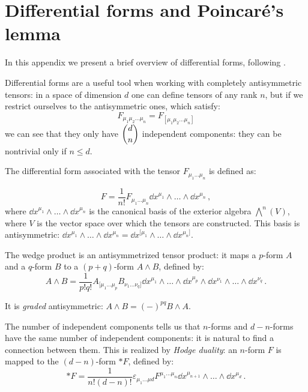 \documentclass[main.tex]{subfiles}
\begin{document}
\clearpage
\appendix

\section{Differential forms and Poincaré's lemma} \label{sec:differential-forms}

In this appendix we present a brief overview of differential forms, following \cite{Lechner}.

Differential forms are a useful tool when working with completely antisymmetric tensors:
in a space of dimension \(d\) one can define tensors of any rank \(n\), but if we restrict ourselves to the antisymmetric ones, which satisfy:
%
\begin{equation}
  F_{\mu_1 \mu_2 \dots \mu_{n}} 
 = F_{[\mu_1 \mu_2 \dots \mu_{n}]}
\end{equation}
%
we can see that they only have \(\dbinom{d}{n}\) independent components: they can be nontrivial only if \(n \leq d\).  

The differential form associated with the tensor \(F_{\mu_1 \dots \mu_{n}}\) is defined as:

\begin{equation}
  F = \frac{1}{n!} F_{\mu_1 \dots \mu_{n}} \dd{x^{\mu_1}} \wedge \dots \wedge \dd{x^{\mu_n}}\,,
\end{equation}
%
where \(\dd{x^{\mu_1}} \wedge \dots \wedge \dd{x^{\mu_n}}\) is the canonical basis of the exterior algebra \(\bigwedge^n (V)\), where \(V\) is the vector space over which the tensors are constructed.
This basis is antisymmetric: \(\dd{x^{\mu_1}} \wedge \dots \wedge \dd{x^{\mu_n}} = \dd{x^{[\mu_1}} \wedge \dots \wedge \dd{x^{\mu_n]}}\).

The wedge product is an antisymmetrized tensor product: it maps a \(p\)-form \(A\) and a \(q\)-form \(B\) to a \((p+q)\)-form \(A \wedge B\), defined by:
\begin{equation}
  A \wedge B = \frac{1}{p!q!} 
  A_{[\mu_1 \dots \mu_{p}} B_{\nu_1 \dots \nu_{q}]}
  \dd{x^{\mu_1}} \wedge \dots \wedge \dd{x^{\mu_p}} \wedge
  \dd{x^{\nu_1}} \wedge \dots \wedge \dd{x^{\nu_q}}\,.
\end{equation}

It is \emph{graded} antisymmetric: \(A \wedge B = (-)^{pq} B \wedge A\).

The number of independent components tells us that \(n\)-forms and \(d-n\)-forms have the same number of independent components: it is natural to find a connection between them. This is realized by \emph{Hodge duality}: an \(n\)-form \(F\) is mapped to the \((d-n)\)-form \(*F\), defined by:
\begin{equation}
  *F = 
  \frac{1}{n!(d-n)!} \varepsilon_{\mu_1 \dots \mu d} F^{\mu_1 \dots \mu_n} \dd{x^{\mu_{n+1}}} \wedge \dots \wedge \dd{x^{\mu_{d}}}\,.
\end{equation}
\end{document}
